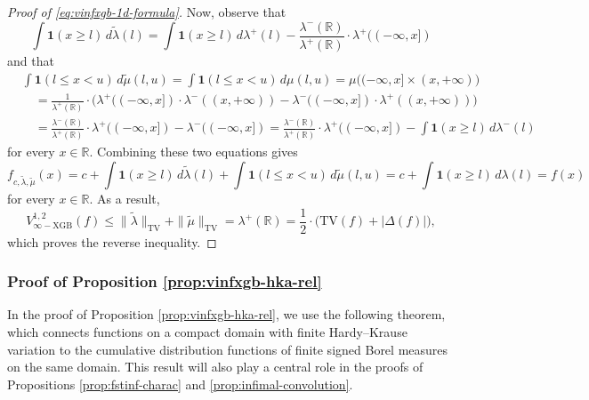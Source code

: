 \documentclass[10pt]{article}
\newcommand{\R}{{\mathbb R}}
\newcommand{\tv}{{\text{TV}}}
\newcommand{\ind}{{\mathbf{1}}}
\begin{document}
\begin{proof}[Proof of \eqref{eq:vinfxgb-1d-formula}]
Now, observe that 
\begin{equation*}
    \int \ind(x \ge l) \, d\widetilde{\lambda}(l)
    = \int \ind(x \ge l) \, d\lambda^+(l) 
    - \frac{\lambda^-(\R)}{\lambda^+(\R)} \cdot \lambda^+((-\infty, x])
\end{equation*}
and that
\begin{equation*}
\begin{aligned}
    &\int \ind(l \le x < u) \, d\widetilde{\mu}(l, u) 
    = \int \ind(l \le x < u) \, d\mu(l, u) 
    = \mu\big((-\infty, x] \times (x, +\infty)\big) \\
    &\quad= \frac{1}{\lambda^+(\R)} \cdot 
    \Big(\lambda^+((-\infty, x]) \cdot \lambda^-((x, +\infty)) 
    - \lambda^-((-\infty, x]) \cdot \lambda^+((x, +\infty))\Big) \\
    &\quad= \frac{\lambda^-(\R)}{\lambda^+(\R)} \cdot \lambda^+((-\infty, x])
    - \lambda^-((-\infty, x]) 
    = \frac{\lambda^-(\R)}{\lambda^+(\R)} \cdot \lambda^+((-\infty, x])
    - \int \ind(x \ge l) \, d\lambda^-(l)
\end{aligned}
\end{equation*}
for every $x \in \R$.
Combining these two equations gives 
\begin{equation*}
    f_{c, \widetilde{\lambda}, \widetilde{\mu}}(x) 
    = c + \int \ind(x \ge l) \, d\widetilde{\lambda}(l)
    + \int \ind(l \le x < u) \, d\widetilde{\mu}(l, u)
    = c + \int \ind(x \ge l) \, d\lambda(l)
    = f(x)
\end{equation*}
for every $x \in \R$. As a result,
\begin{equation*}
    V^{1, 2}_{\infty-\text{XGB}}(f) 
    \le \|\widetilde{\lambda}\|_{\text{TV}} 
    + \|\widetilde{\mu}\|_{\text{TV}} 
    = \lambda^+(\R)
    = \frac{1}{2} \cdot \big(\tv(f) + |\Delta(f)|\big),
\end{equation*}
which proves the reverse inequality.
\end{proof}



\subsubsection{Proof of Proposition \ref{prop:vinfxgb-hka-rel}}
\label{pf:vinfxgb-hka-rel}

In the proof of Proposition \ref{prop:vinfxgb-hka-rel}, we use the 
following theorem, which connects functions on a compact domain with 
finite Hardy–Krause variation to the cumulative distribution functions 
of finite signed Borel measures on the same domain. This result will 
also play a central role in the proofs of 
Propositions \ref{prop:fstinf-charac} and \ref{prop:infimal-convolution}. 
\end{document}
